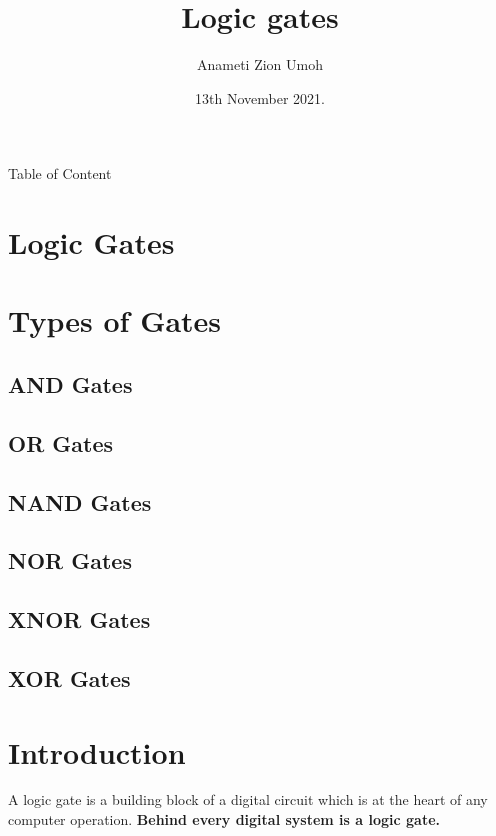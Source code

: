 \documentclass{article}
\title{Logic gates}
\author{Anameti Zion Umoh}
\date{13th November 2021.}
\begin{document}
	\maketitle
	\newpage
	
	
	Table of Content
	\section{Logic Gates}
	\section{Types of Gates}
	\subsection{AND Gates}
	\subsection{OR Gates}
	\subsection{NAND Gates}
	\subsection{NOR Gates}
	\subsection{XNOR Gates}
	\subsection{XOR Gates}
	
	\newpage
	
	\section{Introduction}
A logic gate is a building block of a digital circuit which is at the heart of any computer operation. \textbf{Behind every digital system is a logic gate.}
\end{document}
